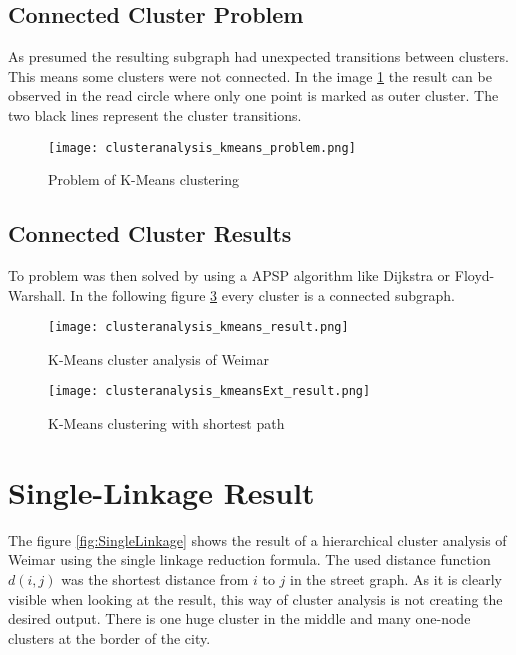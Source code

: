 \subsection{Connected Cluster Problem}
As presumed the resulting subgraph had unexpected transitions between clusters. This means some clusters were not connected. In the image \ref{fig:KmeansProblem} the result can be observed in the read circle where only one point is marked as outer cluster. The two black lines represent the cluster transitions.

\begin{figure}[!ht]
    \centering
    \begin{mdframed}[style=mdthight, userdefinedwidth=0.55\textwidth, align=center]
        \texttt{[image: clusteranalysis\_kmeans\_problem.png]}
    \end{mdframed}
    \caption{Problem of K-Means clustering
        \label{fig:KmeansProblem}}
\end{figure}

\subsection{Connected Cluster Results} \label{sec:K-Means_shortest_path}
To problem was then solved by using a \gls{APSP} algorithm like Dijkstra or Floyd-Warshall. In the following figure \ref{fig:Kmeansshortestp} every cluster is a connected subgraph.

\begin{figure}
    \centering
    \begin{mdframed}[style=mdthight]
        \texttt{[image: clusteranalysis\_kmeans\_result.png]}
    \end{mdframed}
    \caption{K-Means cluster analysis of Weimar \label{fig:KmeansGenerated}}
\end{figure}

\begin{figure}
    \centering
    \begin{mdframed}[style=mdthight]
        \texttt{[image: clusteranalysis\_kmeansExt\_result.png]}
    \end{mdframed}
    \caption{K-Means clustering with shortest path\label{fig:Kmeansshortestp}}
\end{figure}

\section{Single-Linkage Result}
The figure \ref{fig:SingleLinkage} shows the result of a hierarchical cluster analysis of Weimar using the single linkage reduction formula. The used distance function $d(i, j)$ was the shortest distance from $i$ to $j$ in the street graph. As it is clearly visible when looking at the result, this way of cluster analysis is not creating the desired output. There is one huge cluster in the middle and many one-node clusters at the border of the city.

